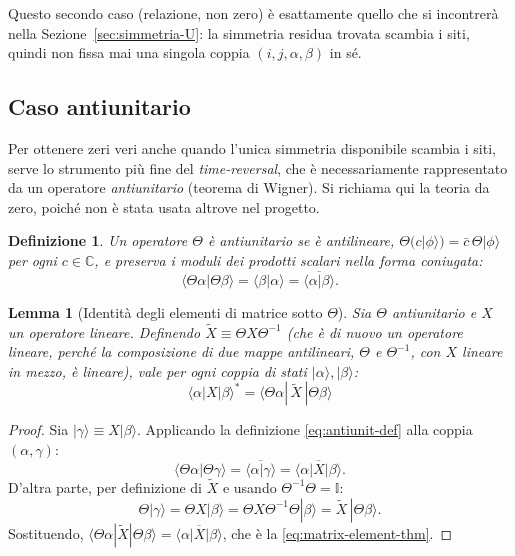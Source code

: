 \documentclass[11pt,a4paper]{article}
\newtheorem{lemma}{Lemma}
\newtheorem*{definizione}{Definizione}
\begin{document}
Questo secondo caso (relazione, non zero) è esattamente quello che si incontrerà nella
Sezione~\ref{sec:simmetria-U}: la simmetria residua trovata scambia i siti, quindi non fissa mai
una singola coppia $(i,j,\alpha,\beta)$ in sé.

\subsection{Caso antiunitario}
\label{sec:crit-antiunitario}

Per ottenere zeri veri anche quando l'unica simmetria disponibile scambia i siti, serve lo
strumento più fine del \emph{time-reversal}, che è necessariamente rappresentato da un operatore
\emph{antiunitario} (teorema di Wigner). Si richiama qui la teoria da zero, poiché non è stata
usata altrove nel progetto.

\begin{definizione}
Un operatore $\Theta$ è antiunitario se è antilineare, $\Theta(c|\phi\rangle)=\bar c\,\Theta|\phi\rangle$
per ogni $c\in\mathbb C$, e preserva i moduli dei prodotti scalari nella forma coniugata:
\begin{equation}
\langle \Theta\alpha|\Theta\beta\rangle = \langle\beta|\alpha\rangle = \overline{\langle\alpha|\beta\rangle}.
\label{eq:antiunit-def}
\end{equation}
\end{definizione}

\begin{lemma}[Identità degli elementi di matrice sotto $\Theta$]
\label{lem:matrix-element}
Sia $\Theta$ antiunitario e $X$ un operatore lineare. Definendo $\widetilde X\equiv\Theta X\Theta^{-1}$
(che è di nuovo un operatore \emph{lineare}, perché la composizione di due mappe antilineari,
$\Theta$ e $\Theta^{-1}$, con $X$ lineare in mezzo, è lineare), vale per ogni coppia di stati
$|\alpha\rangle,|\beta\rangle$:
\begin{equation}
\boxed{\;\langle\alpha|X|\beta\rangle^{*} = \langle\Theta\alpha|\,\widetilde X\,|\Theta\beta\rangle\;}
\label{eq:matrix-element-thm}
\end{equation}
\end{lemma}

\begin{proof}
Sia $|\gamma\rangle\equiv X|\beta\rangle$. Applicando la definizione \eqref{eq:antiunit-def} alla
coppia $(\alpha,\gamma)$:
\begin{equation}
\langle\Theta\alpha|\Theta\gamma\rangle = \overline{\langle\alpha|\gamma\rangle}
= \overline{\langle\alpha|X|\beta\rangle}.
\end{equation}
D'altra parte, per definizione di $\widetilde X$ e usando $\Theta^{-1}\Theta=\mathbb I$:
\begin{equation}
\Theta|\gamma\rangle = \Theta X|\beta\rangle = \Theta X\Theta^{-1}\Theta|\beta\rangle
= \widetilde X\,|\Theta\beta\rangle.
\end{equation}
Sostituendo, $\langle\Theta\alpha|\widetilde X|\Theta\beta\rangle = \overline{\langle\alpha|X|\beta\rangle}$,
che è la \eqref{eq:matrix-element-thm}.
\end{proof}
\end{document}

